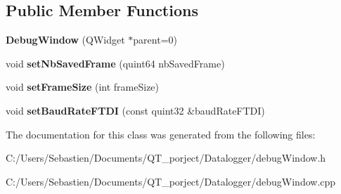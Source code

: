 \subsection*{Public Member Functions}
\begin{DoxyCompactItemize}
\item 
\mbox{\label{class_debug_window_a3d30802f186989ab6d24e970320e3c42}} 
{\bfseries Debug\+Window} (Q\+Widget $\ast$parent=0)
\item 
\mbox{\label{class_debug_window_a0832ddf91cdc920ed5d069360daaf33a}} 
void {\bfseries set\+Nb\+Saved\+Frame} (quint64 nb\+Saved\+Frame)
\item 
\mbox{\label{class_debug_window_a767b6a5c6731281abfa64f6e5e9cb62e}} 
void {\bfseries set\+Frame\+Size} (int frame\+Size)
\item 
\mbox{\label{class_debug_window_a714f2082c0d9fceed30697a263c5154c}} 
void {\bfseries set\+Baud\+Rate\+F\+T\+DI} (const quint32 \&baud\+Rate\+F\+T\+DI)
\end{DoxyCompactItemize}


The documentation for this class was generated from the following files\+:\begin{DoxyCompactItemize}
\item 
C\+:/\+Users/\+Sebastien/\+Documents/\+Q\+T\+\_\+porject/\+Datalogger/debug\+Window.\+h\item 
C\+:/\+Users/\+Sebastien/\+Documents/\+Q\+T\+\_\+porject/\+Datalogger/debug\+Window.\+cpp\end{DoxyCompactItemize}
